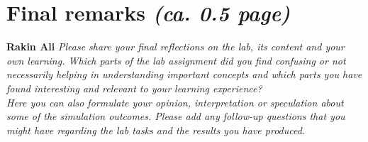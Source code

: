 \documentclass[a4paper]{article}
\begin{document}
\section{Final remarks \normalsize{\textit{(ca. 0.5 page)}}} \textbf{Rakin Ali }
\textit{Please share your final reflections on the lab, its content and your own learning. Which parts of the lab assignment did you find confusing or not necessarily helping in understanding important concepts and which parts you have found interesting and relevant to your learning experience? \\
Here you can also formulate your opinion, interpretation or speculation about some of the simulation outcomes. Please add any follow-up questions that you might have regarding the lab tasks and the results you have produced.}
\end{document}
